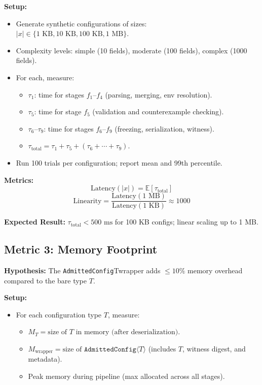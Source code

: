 \textbf{Setup:}
\begin{itemize}
  \item Generate synthetic configurations of sizes:
        $|x| \in \{1\text{ KB}, 10\text{ KB}, 100\text{ KB}, 1\text{ MB}\}$.
  \item Complexity levels: simple (10 fields), moderate (100 fields),
        complex (1000 fields).
  \item For each, measure:
    \begin{itemize}
      \item $\tau_1$: time for stages $f_1$--$f_4$ (parsing, merging, env resolution).
      \item $\tau_5$: time for stage $f_5$ (validation and counterexample checking).
      \item $\tau_6$--$\tau_9$: time for stages $f_6$--$f_9$ (freezing, serialization, witness).
      \item $\tau_{\mathrm{total}} = \tau_1 + \tau_5 + (\tau_6 + \cdots + \tau_9)$.
    \end{itemize}
  \item Run 100 trials per configuration; report mean and 99th percentile.
\end{itemize}

\textbf{Metrics:}
\[
  \mathrm{Latency}(|x|) = \mathbb{E}[\tau_{\mathrm{total}}]
\]
\[
  \mathrm{Linearity} = \frac{\mathrm{Latency}(1\text{ MB})}{\mathrm{Latency}(1\text{ KB})} \approx 1000
\]

\textbf{Expected Result:} $\tau_{\mathrm{total}} < 500\text{ ms}$ for 100 KB configs;
linear scaling up to 1 MB.

\subsection{Metric 3: Memory Footprint}

\textbf{Hypothesis:} The \texttt{AdmittedConfig}\langle T\rangle wrapper adds
$\leq 10\%$ memory overhead compared to the bare type $T$.

\textbf{Setup:}
\begin{itemize}
  \item For each configuration type $T$, measure:
    \begin{itemize}
      \item $M_T = \text{size of } T \text{ in memory (after deserialization)}$.
      \item $M_{\mathrm{wrapper}} = \text{size of } \texttt{AdmittedConfig}\langle T\rangle$
            (includes $T$, witness digest, and metadata).
      \item Peak memory during pipeline (max allocated across all stages).
    \end{itemize}
\end{itemize}

